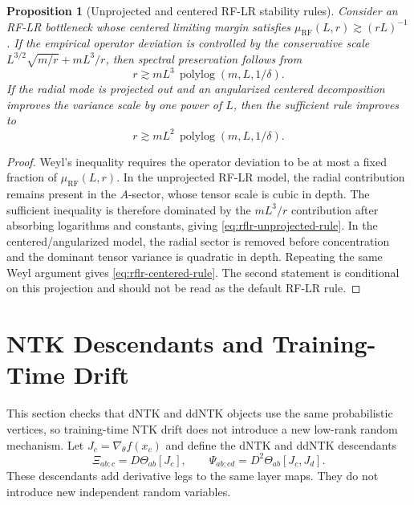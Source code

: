\documentclass{article}
\newtheorem{proposition}[theorem]{Proposition}
\begin{document}
\begin{proposition}[Unprojected and centered RF-LR stability rules]
\label{prop:rflr-rules}
Consider an RF-LR bottleneck whose centered limiting margin satisfies
\(\mu_{\mathrm{RF}}(L,r)\gtrsim (rL)^{-1}\). If the empirical operator deviation is controlled by the conservative scale \(L^{3/2}\sqrt{m/r}+mL^3/r\), then spectral preservation follows from
\begin{equation}
r\gtrsim mL^3\,\operatorname{polylog}(m,L,1/\delta).
\label{eq:rflr-unprojected-rule}
\end{equation}
If the radial mode is projected out and an angularized centered decomposition improves the variance scale by one power of \(L\), then the sufficient rule improves to
\begin{equation}
r\gtrsim mL^2\,\operatorname{polylog}(m,L,1/\delta).
\label{eq:rflr-centered-rule}
\end{equation}
\end{proposition}

\begin{proof}
Weyl's inequality requires the operator deviation to be at most a fixed fraction of \(\mu_{\mathrm{RF}}(L,r)\). In the unprojected RF-LR model, the radial contribution remains present in the \(A\)-sector, whose tensor scale is cubic in depth. The sufficient inequality is therefore dominated by the \(mL^3/r\) contribution after absorbing logarithms and constants, giving \eqref{eq:rflr-unprojected-rule}. In the centered/angularized model, the radial sector is removed before concentration and the dominant tensor variance is quadratic in depth. Repeating the same Weyl argument gives \eqref{eq:rflr-centered-rule}. The second statement is conditional on this projection and should not be read as the default RF-LR rule.
\end{proof}

\iffalse
\section{NTK Descendants and Training-Time Drift}
This section checks that dNTK and ddNTK objects use the same probabilistic vertices, so training-time NTK drift does not introduce a new low-rank random mechanism.
Let \(J_c=\nabla_\theta f(x_c)\) and define the dNTK and ddNTK descendants
\begin{equation}
\Xi_{ab;c}=D\Theta_{ab}[J_c],
\qquad
\Psi_{ab;cd}=D^2\Theta_{ab}[J_c,J_d].
\end{equation}
These descendants add derivative legs to the same layer maps. They do not introduce new independent random variables.
\end{document}
